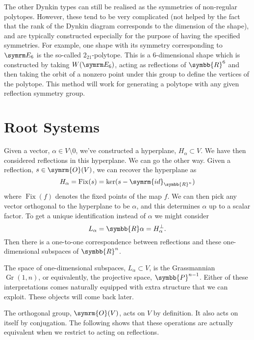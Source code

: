 \documentclass[fleqn, a4paper, openany]{memoir}
\newcommand{\reals}{\symbb{R}}
\newcommand{\id}{\symrm{id}}
\newcommand{\orthogonal}{\symrm{O}}
\DeclareMathOperator{\Fix}{Fix}
\DeclareMathOperator{\Gr}{Gr}
\newcommand{\projective}{\symbb{P}}
\begin{document}
    The other Dynkin types can still be realised as the symmetries of non-regular polytopes.
    However, these tend to be very complicated (not helped by the fact that the rank of the Dynkin diagram corresponds to the dimension of the shape), and are typically constructed especially for the purpose of having the specified symmetries.
    For example, one shape with its symmetry corresponding to \(\E[6]\) is the so-called \(2_{21}\)-polytope.
    This is a \(6\)-dimensional shape which is constructed by taking \(W(\E[6])\), acting as reflections of \(\reals^6\) and then taking the orbit of a nonzero point under this group to define the vertices of the polytope.
    This method will work for generating a polytope with any given reflection symmetry group.
    
    \section{Root Systems}
    Given a vector, \(\alpha \in V \setminus 0\), we've constructed a hyperplane, \(H_\alpha \subset V\).
    We have then considered reflections in this hyperplane.
    We can go the other way.
    Given a reflection, \(s \in \orthogonal(V)\), we can recover the hyperplane as
    \begin{equation}
        H_\alpha = \Fix(s) = \ker(s - \id_{\reals^n})
    \end{equation}
    where \(\Fix(f)\) denotes the fixed points of the map \(f\).
    We can then pick any vector orthogonal to the hyperplane to be \(\alpha\), and this determines \(\alpha\) up to a scalar factor.
    To get a unique identification instead of \(\alpha\) we might consider
    \begin{equation}
        L_\alpha = \reals \alpha = H_\alpha^{\perp}.
    \end{equation}
    Then there is a one-to-one correspondence between reflections and these one-dimensional subspaces of \(\reals^n\).
    
    \begin{remark}{}{}
        The space of one-dimensional subspaces, \(L_\alpha \subset V\), is the Grassmannian \(\Gr(1, n)\), or equivalently, the projective space, \(\projective^{n-1}\).
        Either of these interpretations comes naturally equipped with extra structure that we can exploit.
        These objects will come back later.
    \end{remark}
    
    The orthogonal group, \(\orthogonal(V)\), acts on \(V\) by definition.
    It also acts on itself by conjugation.
    The following shows that these operations are actually equivalent when we restrict to acting on reflections.
    
\end{document}
